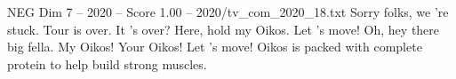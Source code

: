\begin{textsample}{NEG Dim 7 – 2020 – Score 1.00 – 2020/tv\_com\_2020\_18.txt}  \label{ex:f7_neg_013}
Sorry folks, we 're stuck.
Tour is over.
It 's over?
Here, hold my Oikos.
Let 's move!
Oh, hey there big fella.
My Oikos!
Your Oikos!
Let 's move!
Oikos is packed with complete protein to help build strong muscles.

\end{textsample}
